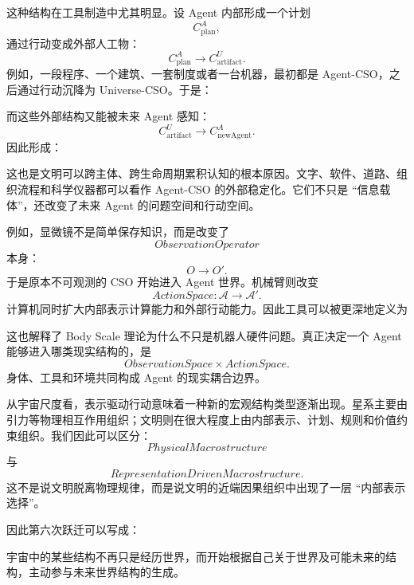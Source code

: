 这种结构在工具制造中尤其明显。设 Agent 内部形成一个计划
\[
C_{\mathrm{plan}}^A,
\]
通过行动变成外部人工物：
\[
C_{\mathrm{plan}}^A
\rightarrow
C_{\mathrm{artifact}}^U.
\]
例如，一段程序、一个建筑、一套制度或者一台机器，最初都是 Agent-CSO，之后通过行动沉降为 Universe-CSO。于是：
\begin{statementbox}
\centering
{}
\end{statementbox}
而这些外部结构又能被未来 Agent 感知：
\[
C_{\mathrm{artifact}}^U
\rightarrow
C_{\mathrm{newAgent}}^A.
\]
因此形成：
\begin{statementbox}
\centering
{}
\end{statementbox}

这也是文明可以跨主体、跨生命周期累积认知的根本原因。文字、软件、道路、组织流程和科学仪器都可以看作 Agent-CSO 的外部稳定化。它们不只是 ``信息载体''，还改变了未来 Agent 的问题空间和行动空间。

例如，显微镜不是简单保存知识，而是改变了
\[
ObservationOperator
\]
本身：
\[
O
\rightarrow
O'.
\]
于是原本不可观测的 CSO 开始进入 Agent 世界。机械臂则改变
\[
ActionSpace:
\mathcal A
\rightarrow
\mathcal A'.
\]
计算机同时扩大内部表示计算能力和外部行动能力。因此工具可以被更深地定义为
\begin{statementbox}
\centering
{}
\end{statementbox}

这也解释了 Body Scale 理论为什么不只是机器人硬件问题。真正决定一个 Agent 能够进入哪类现实结构的，是
\[
ObservationSpace
\times
ActionSpace.
\]
身体、工具和环境共同构成 Agent 的现实耦合边界。

从宇宙尺度看，表示驱动行动意味着一种新的宏观结构类型逐渐出现。星系主要由引力等物理相互作用组织；文明则在很大程度上由内部表示、计划、规则和价值约束组织。我们因此可以区分：
\[
PhysicalMacrostructure
\]
与
\[
RepresentationDrivenMacrostructure.
\]
这不是说文明脱离物理规律，而是说文明的近端因果组织中出现了一层 ``内部表示选择''。

因此第六次跃迁可以写成：
\begin{statementbox}
\centering
{}
\end{statementbox}
宇宙中的某些结构不再只是经历世界，而开始根据自己关于世界及可能未来的结构，主动参与未来世界结构的生成。

